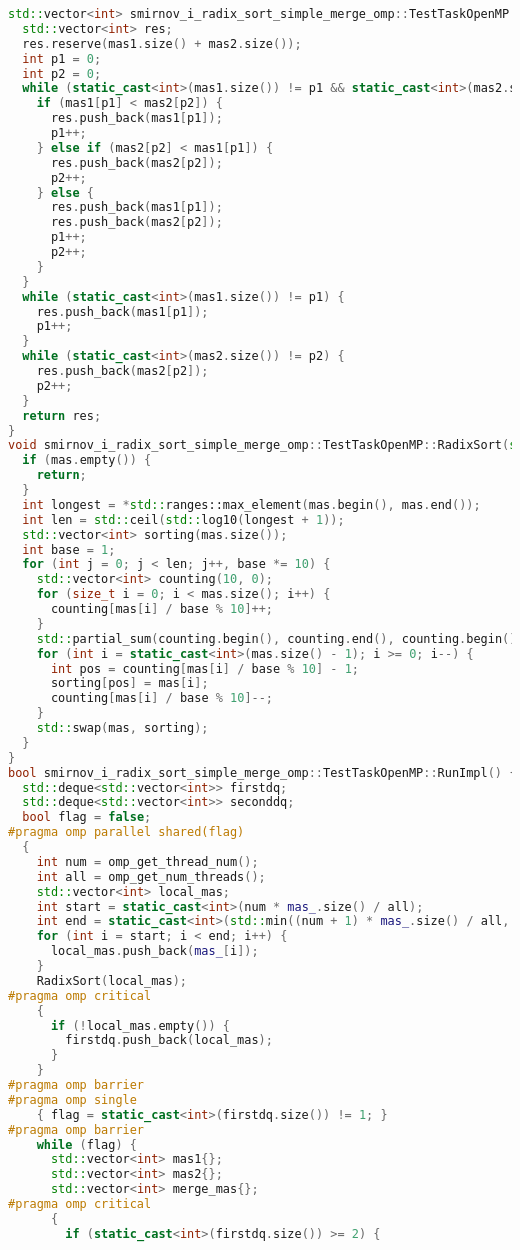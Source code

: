 \documentclass[a4paper,12pt]{article}
\begin{document}
\begin{lstlisting}[language=C++,caption={Фрагмент OpenMP-версии}]
std::vector<int> smirnov_i_radix_sort_simple_merge_omp::TestTaskOpenMP::Merge(std::vector<int> mas1, std::vector<int> mas2) {
  std::vector<int> res;
  res.reserve(mas1.size() + mas2.size());
  int p1 = 0;
  int p2 = 0;
  while (static_cast<int>(mas1.size()) != p1 && static_cast<int>(mas2.size()) != p2) {
    if (mas1[p1] < mas2[p2]) {
      res.push_back(mas1[p1]);
      p1++;
    } else if (mas2[p2] < mas1[p1]) {
      res.push_back(mas2[p2]);
      p2++;
    } else {
      res.push_back(mas1[p1]);
      res.push_back(mas2[p2]);
      p1++;
      p2++;
    }
  }
  while (static_cast<int>(mas1.size()) != p1) {
    res.push_back(mas1[p1]);
    p1++;
  }
  while (static_cast<int>(mas2.size()) != p2) {
    res.push_back(mas2[p2]);
    p2++;
  }
  return res;
}
void smirnov_i_radix_sort_simple_merge_omp::TestTaskOpenMP::RadixSort(std::vector<int>& mas) {
  if (mas.empty()) {
    return;
  }
  int longest = *std::ranges::max_element(mas.begin(), mas.end());
  int len = std::ceil(std::log10(longest + 1));
  std::vector<int> sorting(mas.size());
  int base = 1;
  for (int j = 0; j < len; j++, base *= 10) {
    std::vector<int> counting(10, 0);
    for (size_t i = 0; i < mas.size(); i++) {
      counting[mas[i] / base % 10]++;
    }
    std::partial_sum(counting.begin(), counting.end(), counting.begin());
    for (int i = static_cast<int>(mas.size() - 1); i >= 0; i--) {
      int pos = counting[mas[i] / base % 10] - 1;
      sorting[pos] = mas[i];
      counting[mas[i] / base % 10]--;
    }
    std::swap(mas, sorting);
  }
}
bool smirnov_i_radix_sort_simple_merge_omp::TestTaskOpenMP::RunImpl() {
  std::deque<std::vector<int>> firstdq;
  std::deque<std::vector<int>> seconddq;
  bool flag = false;
#pragma omp parallel shared(flag)
  {
    int num = omp_get_thread_num();
    int all = omp_get_num_threads();
    std::vector<int> local_mas;
    int start = static_cast<int>(num * mas_.size() / all);
    int end = static_cast<int>(std::min((num + 1) * mas_.size() / all, mas_.size()));
    for (int i = start; i < end; i++) {
      local_mas.push_back(mas_[i]);
    }
    RadixSort(local_mas);
#pragma omp critical
    {
      if (!local_mas.empty()) {
        firstdq.push_back(local_mas);
      }
    }
#pragma omp barrier
#pragma omp single
    { flag = static_cast<int>(firstdq.size()) != 1; }
#pragma omp barrier
    while (flag) {
      std::vector<int> mas1{};
      std::vector<int> mas2{};
      std::vector<int> merge_mas{};
#pragma omp critical
      {
        if (static_cast<int>(firstdq.size()) >= 2) {

\end{lstlisting}
\end{document}
